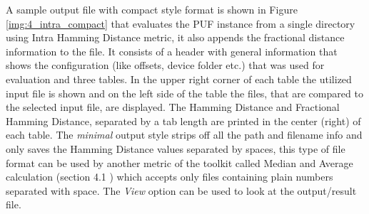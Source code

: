 A sample output file with compact style format is shown in Figure \ref{img:4_intra_compact} that evaluates the PUF instance from a single directory using Intra Hamming Distance metric, it also appends the fractional distance information to the file. It consists of a header with general information that shows the configuration (like offsets, device folder etc.) that was used for evaluation and three tables. In the upper right corner of each table the utilized input file is shown and on the left side of the table
the files, that are compared to the selected input file, are displayed. The Hamming Distance and Fractional Hamming Distance, separated by a tab length are printed in the center (right) of each table. The
\emph{minimal} output style strips off all the path and filename info and only saves the Hamming Distance values separated by spaces, this type of file format can be used by another metric of the toolkit called Median and Average calculation (section 4.1 \cite{71}) which accepts only files containing plain numbers separated with space. The \emph{View} option can be used to look at the output/result file.\\

